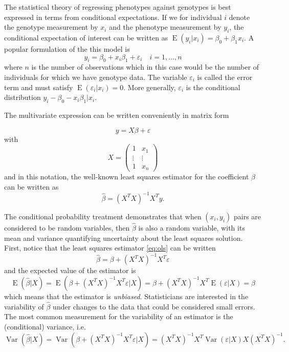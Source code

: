 \documentclass[review]{siamart0516}
\DeclareMathOperator{\E}{E}
\DeclareMathOperator{\Var}{Var}
\begin{document}
The statistical theory of regressing phenotypes against genotypes is best expressed
in terms from conditional expectations. If we for individual $i$ denote the genotype measurement by $x_i$ and the phenotype measurement by $y_i$, the conditional
expectation of interest can be written as $\E(y_i|x_i)=\beta_0 + \beta_1 x_i$.
A popular formulation of the this model is
%
\begin{equation*}
    y_i = \beta_0 + x_i \beta_1 + \varepsilon_i\quad i=1,\dots,n
\end{equation*}
%
where $n$ is the number of observations which in this case would be the number of individuals for which we have genotype data.
The variable $\varepsilon_i$ is called the error term and must satisfy $\E(\varepsilon_i|x_i)=0$.
More generally, $\varepsilon_i$ is the conditional distribution $y_i - \beta_0 - x_i\beta_1|x_i$.

The multivariate expression can be written conveniently in matrix form

\begin{equation}
\label{eq:linreg}
    y = X\beta + \varepsilon
\end{equation}
%
with
%
\begin{equation*}
    X = \begin{pmatrix}
        1 & x_1\\
        \vdots & \vdots \\
        1 & x_n
    \end{pmatrix}
\end{equation*}
%
and in this notation, the well-known least squares estimator for the coefficient
$\beta$ can be written as
%
\begin{equation}
\label{eq:ols}
    \hat{\beta} = (X^TX)^{-1}X^Ty.
\end{equation}

The conditional probability treatment demonstrates that when $(x_i,y_i)$ pairs
are considered to be random variables, then $\hat{\beta}$ is also a random
variable, with its mean and variance quantifying uncertainty about the least
squares solution.
First, notice that the least squares estimator \eqref{eq:ols} can be written
%
\begin{equation*}
    \hat{\beta} = \beta + (X^TX)^{-1}X^T\varepsilon
\end{equation*}
%
and the expected value of the estimator is
%
\begin{equation}
    \E(\hat{\beta}|X) = \E(\beta + (X^TX)^{-1}X^T\varepsilon|X) =
        \beta + (X^TX)^{-1}X^T\E(\varepsilon|X) = \beta
\end{equation}
%
which means that the estimator is \emph{unbiased}. Statisticians are interested in the variability of $\hat{\beta}$ under changes to the data that could be considered small errors. The most common measurement for the variability of an estimator is the (conditional) variance, i.e.
%
\begin{equation*}
    \Var(\hat{\beta}|X) = \Var(\beta + (X^TX)^{-1}X^T\varepsilon|X) =
        (X^TX)^{-1}X^T\Var(\varepsilon|X)X(X^TX)^{-1}.
\end{equation*}
\end{document}
